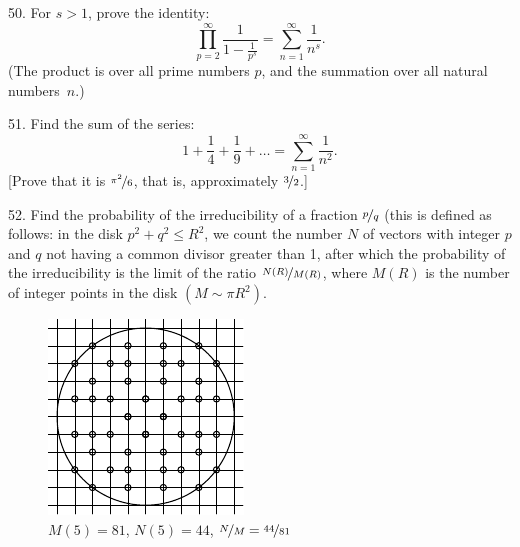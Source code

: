 \begin{problem}{50.}
	For $s>1$, prove the identity:
	\begin{equation*}
		\textstyle\prod\limits_{p=2}^{\infty} \frac{1}{1-\frac{1}{p^s}}=\textstyle\sum\limits_{n=1}^{\infty} \frac{1}{n^s}.
	\end{equation*}
	(The product is over all prime numbers $p$, and the summation over all natural numbers~$n$.)
\end{problem}

\begin{problem}{51.}
	Find the sum of the series:
	\begin{equation*}
		1+ \frac{1}{4}+ \frac{1}{9}+\dots=\textstyle\sum\limits_{n=1}^{\infty} \frac{1}{n^2}.
	\end{equation*}
	[Prove that it is $\nicefrac{\pi^2}{6}$, that is, approximately $\nicefrac{3}{2}$.] 
\end{problem}

\begin{problem}{52.} 
	Find the probability of the irreducibility of a fraction $\nicefrac{p}{q}$ (this is defined as follows:
	in the disk $p^2+q^2 \leqslant R^2$, we count the number $N$ of vectors with integer
	$p$ and $q$ not having a common divisor greater than 1, after which the probability of the irreducibility is the
	limit of the ratio $\nicefrac{N(R)}{M(R)}$, where $M(R)$ is the number of integer points in the disk $(M \sim \pi R^2)$.
	\begin{figure}
		\includegraphics{taskbook-36}\\
		\footnotesize $M(5)=81$, $N(5)=44$, $\nicefrac{N}{M} = \nicefrac{44}{81}$
	\end{figure}
\end{problem}

